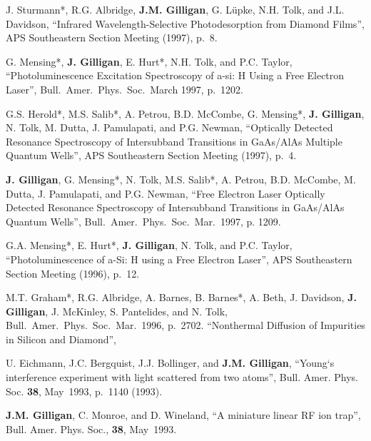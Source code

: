 \item
  J. Sturmann*, R.G. Albridge, \textbf{J.M. Gilligan}, G. L\"upke, N.H. Tolk, and J.L. Davidson,
  \enquote{Infrared Wavelength-Selective Photodesorption from Diamond Films},
  APS Southeastern Section Meeting (1997), p.~8.

\item
  G. Mensing*, \textbf{J. Gilligan}, E. Hurt*, N.H. Tolk, and P.C. Taylor,
  \enquote{Photoluminescence Excitation Spectroscopy of a-si: H Using a Free Electron Laser},
Bull.\ Amer.\ Phys.\ Soc.\ March 1997, p.~1202.

\item
  G.S. Herold*, M.S. Salib*, A. Petrou, B.D. McCombe, G. Mensing*, \textbf{J. Gilligan}, N. Tolk, M. Dutta, J. Pamulapati, and P.G. Newman,
  \enquote{Optically Detected Resonance Spectroscopy of Intersubband Transitions in GaAs/AlAs Multiple Quantum Wells},
  APS Southeastern Section Meeting (1997), p.~4.

\item
  \textbf{J. Gilligan}, G. Mensing*, N. Tolk, M.S. Salib*, A. Petrou, B.D. McCombe, M. Dutta, J. Pamulapati, and P.G. Newman,
  \enquote{Free Electron Laser Optically Detected Resonance Spectroscopy of Intersubband Transitions in GaAs/AlAs Quantum Wells},
  Bull.\ Amer.\ Phys.\ Soc.\ Mar.~1997, p. 1209.

\item
  G.A. Mensing*, E. Hurt*, \textbf{J. Gilligan}, N. Tolk, and P.C. Taylor,
  \enquote{Photoluminescence of a-Si: H using a Free Electron Laser},
  APS Southeastern Section Meeting (1996), p.~12.


\item
  M.T. Graham*, R.G. Albridge, A. Barnes, B. Barnes*, A. Beth, J. Davidson, \textbf{J. Gilligan}, J. McKinley, S. Pantelides, and N. Tolk, Bull.\ Amer.\ Phys.\ Soc.\ Mar.~1996, p.~2702.
  \enquote{Nonthermal Diffusion of Impurities in Silicon and Diamond},

 \item
 U. Eichmann, J.C. Bergquist, J.J. Bollinger, and \textbf{J.M. Gilligan},
 \enquote{Young`s interference experiment with light scattered from two atoms},
 Bull. Amer. Phys. Soc. \textbf{38}, May~1993, p.~1140 (1993).

\item
 \textbf{J.M. Gilligan}, C. Monroe, and D. Wineland,
  \enquote{A miniature linear RF ion trap},
  Bull. Amer. Phys. Soc., \textbf{38}, May~1993.
